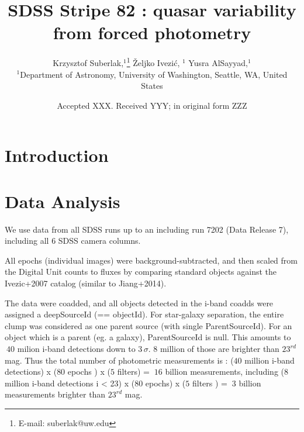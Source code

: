 \documentclass[fleqn,usenatbib]{mnras}  %
\title[SDSS Quasars]{SDSS Stripe 82 : quasar variability from forced photometry}
\author[K. Suberlak et al.]{
Krzysztof Suberlak,$^{1}$\thanks{E-mail: suberlak@uw.edu}
\v{Z}eljko Ivezi\'c, $^{1}$
Yusra AlSayyad,$^{1}$ 
\\
$^{1}$Department of Astronomy, University of Washington, Seattle, WA, United States\\
}
\date{Accepted XXX. Received YYY; in original form ZZZ}
\begin{document}
\label{firstpage}
\pagerange{\pageref{firstpage}--\pageref{lastpage}}
\maketitle

\begin{abstract}

\end{abstract}




\section{Introduction}
\label{sec:intro}


\section{Data Analysis}
\label{sec:data}

We use data from all SDSS runs up to an including run 7202 (Data Release 7), including all 6 SDSS camera columns. 

All epochs (individual images) were background-subtracted, and then scaled from the Digital Unit counts to fluxes by comparing standard objects against the Ivezic+2007 catalog  (similar to  Jiang+2014).   

The data were coadded, and all objects detected in the i-band coadds were assigned a deepSourceId (== objectId). For star-galaxy separation, the entire clump was considered as one parent source (with single ParentSourceId). For an object which is a parent (eg. a galaxy), ParentSourceId is null.  This amounts to $~40$ milion  i-band detections down to $3 \, \sigma$.  $8$ million of those are brighter than $23^{rd}$ mag. Thus the total number of photometric measurements is : ($40$  million i-band detections) x ($80$ epochs ) x ($5$ filters) = $~16$ billion measurements, including   ($8$ million i-band detections i < 23) x ($80$ epochs) x ($5$ filters ) = $~3$ billion measurements brighter than $23^{rd}$ mag.
\end{document}
